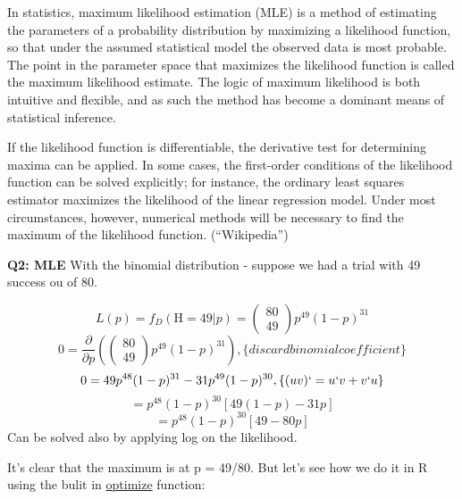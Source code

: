 \documentclass[]{article}
\begin{document}
In statistics, maximum likelihood estimation (MLE) is a method of
estimating the parameters of a probability distribution by maximizing a
likelihood function, so that under the assumed statistical model the
observed data is most probable. The point in the parameter space that
maximizes the likelihood function is called the maximum likelihood
estimate. The logic of maximum likelihood is both intuitive and
flexible, and as such the method has become a dominant means of
statistical inference.

If the likelihood function is differentiable, the derivative test for
determining maxima can be applied. In some cases, the first-order
conditions of the likelihood function can be solved explicitly; for
instance, the ordinary least squares estimator maximizes the likelihood
of the linear regression model. Under most circumstances, however,
numerical methods will be necessary to find the maximum of the
likelihood function. (``Wikipedia'')

\textbf{Q2: MLE} With the binomial distribution - suppose we had a trial
with 49 success ou of 80.

\begin{equation}
L(p)=f_{D}(\mathrm{H}=49 | p)=\left(\begin{array}{c}{80} \\ {49}\end{array}\right) p^{49}(1-p)^{31}\end{equation}
\begin{equation}
0=\frac{\partial}{\partial p}\left(\left(\begin{array}{c}{80} \\ {49}\end{array}\right) p^{49}(1-p)^{31}\right) , \{discard binomial coefficient\}
\end{equation} \begin{equation}
0=49 p^{48}(1-p)^{31}-31 p^{49}(1-p)^{30}, \{(uv)` = u`v +v`u\}
\end{equation} \begin{equation}
=p^{48}(1-p)^{30}[49(1-p)-31 p]
\end{equation} \begin{equation}
=p^{48}(1-p)^{30}[49-80 p]
\end{equation} Can be solved also by applying log on the likelihood.

It's clear that the maximum is at p = 49/80. But let's see how we do it
in R using the bulit in
\href{ehttps://stat.ethz.ch/R-manual/R-devel/library/stats/html/optimize.html}{optimize}
function:
\end{document}
